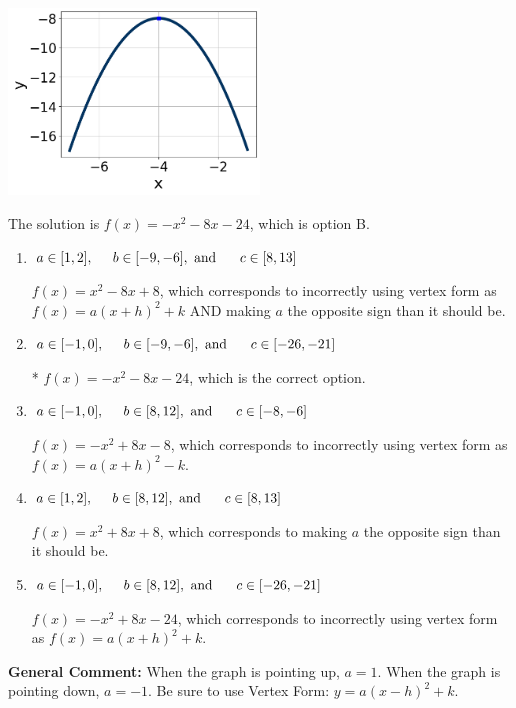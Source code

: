 \documentclass{extbook}[14pt]
\begin{document}
\begin{enumerate}
{\begin{center}
    \includegraphics[width=0.5\textwidth]{../Figures/quadraticGraphToEquationCopyB.png}
\end{center}


The solution is \( f(x) = -x^{2} -8 x -24 \), which is option B.\begin{enumerate}[label=\Alph*.]
\item \( a \in [1, 2], \hspace*{5mm} b \in [-9, -6], \text{ and } \hspace*{5mm} c \in [8, 13] \)

$f(x)=x^{2} -8 x + 8$, which corresponds to incorrectly using vertex form as $f(x) = a(x+h)^2+k$ AND making $a$ the opposite sign than it should be.
\item \( a \in [-1, 0], \hspace*{5mm} b \in [-9, -6], \text{ and } \hspace*{5mm} c \in [-26, -21] \)

* $f(x)=-x^{2} -8 x -24$, which is the correct option.
\item \( a \in [-1, 0], \hspace*{5mm} b \in [8, 12], \text{ and } \hspace*{5mm} c \in [-8, -6] \)

$f(x)=-x^{2} +8 x -8$, which corresponds to incorrectly using vertex form as $f(x) = a(x+h)^2 - k$.
\item \( a \in [1, 2], \hspace*{5mm} b \in [8, 12], \text{ and } \hspace*{5mm} c \in [8, 13] \)

$f(x)=x^{2} +8 x + 8$, which corresponds to making $a$ the opposite sign than it should be.
\item \( a \in [-1, 0], \hspace*{5mm} b \in [8, 12], \text{ and } \hspace*{5mm} c \in [-26, -21] \)

$f(x)=-x^{2} +8 x -24$, which corresponds to incorrectly using vertex form as $f(x) = a(x+h)^2+k$.
\end{enumerate}

\textbf{General Comment:} When the graph is pointing up, $a=1$. When the graph is pointing down, $a=-1$. Be sure to use Vertex Form: $y = a(x-h)^2+k$.
}
\end{enumerate}
\end{document}
